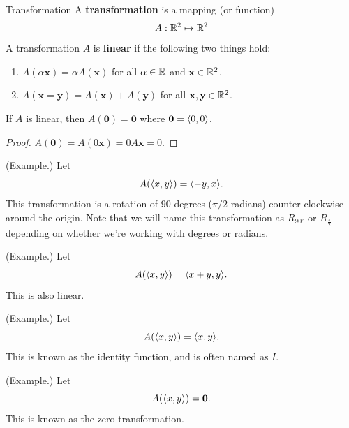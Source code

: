 \documentclass[letterpaper]{article}
\begin{document}
\begin{definition}{Transformation}{}
    A \textbf{transformation} is a mapping (or function) 
    \[A: \mathbb{R}^2 \mapsto \mathbb{R}^2\]
    A transformation $A$ is \textbf{linear} if the following two things hold: 
    \begin{enumerate}
        \item $A(\alpha \mathbf{x}) = \alpha A(\mathbf{x})$ for all $\alpha \in \mathbb{R}$ and $\mathbf{x} \in \mathbb{R}^2$. 
        \item $A(\mathbf{x} = \mathbf{y}) = A(\mathbf{x}) + A(\mathbf{y})$ for all $\mathbf{x}, \mathbf{y} \in \mathbb{R}^2$. 
    \end{enumerate}
\end{definition}

\begin{theorem}{}{}
    If $A$ is linear, then $A(\mathbf{0}) = \mathbf{0}$ where $\mathbf{0} = \langle 0, 0 \rangle$. 
\end{theorem}

\begin{mdframed}[]
    \begin{proof}
        $A(\mathbf{0}) = A(0 \mathbf{x}) = 0A\mathbf{x} = 0.$ 
    \end{proof}
\end{mdframed}

\begin{mdframed}[]
    (Example.) Let  
    \[A(\langle x, y \rangle) = \langle -y, x \rangle.\]
    This transformation is a rotation of 90 degrees ($\pi / 2$ radians) counter-clockwise around the origin. Note that we will name this transformation as $R_{90^{\circ}}$ or $R_{\frac{\pi}{2}}$ depending on whether we're working with degrees or radians. 
\end{mdframed}

\begin{mdframed}[]
    (Example.) Let 
    \[A(\langle x, y \rangle) = \langle x + y, y \rangle.\]
    This is also linear. 
\end{mdframed}

\begin{mdframed}[]
    (Example.) Let 
    \[A(\langle x, y \rangle) = \langle x, y \rangle.\]
    This is known as the identity function, and is often named as $I$. 
\end{mdframed}

\begin{mdframed}[]
    (Example.) Let 
    \[A(\langle x, y \rangle) = \mathbf{0}.\]
    This is known as the zero transformation. 
\end{mdframed}
\end{document}
